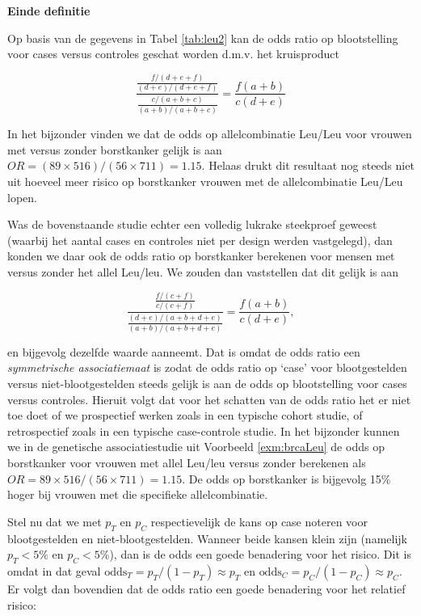 \documentclass[
  12pt,dutch,coursenotes]{book}
\theoremstyle{definition}
\theoremstyle{definition}
\theoremstyle{definition}
\theoremstyle{definition}
\theoremstyle{remark}
\begin{document}
\textbf{Einde definitie}

Op basis van de gegevens in Tabel \ref{tab:leu2} kan de odds ratio op
blootstelling voor cases versus controles geschat worden d.m.v. het kruisproduct

\begin{equation*}
\frac{ \frac{ f/(d+e+f)}{(d+e)/(d+e+f)} }{ \frac{c/(a+b+c)}{(a+b)/(a+b+c)}} = \frac{f(a+b)}{c (d+e)}
\end{equation*}

In het bijzonder vinden we dat de odds op allelcombinatie Leu/Leu voor vrouwen met versus zonder borstkanker gelijk is aan \(OR=(89\times 516)/(56\times 711)=1.15\). Helaas drukt dit resultaat nog steeds
niet uit hoeveel meer risico op borstkanker vrouwen met de allelcombinatie Leu/Leu lopen.

Was de bovenstaande studie echter een volledig lukrake steekproef geweest
(waarbij het aantal cases en controles niet per design werden vastgelegd),
dan konden we daar ook de odds ratio op borstkanker berekenen voor mensen
met versus zonder het allel Leu/leu. We zouden dan vaststellen dat dit gelijk is
aan

\begin{equation*}
\frac{ \frac{ f/(c+f)}{c/(c+f)} }{ \frac{(d+e)/(a+b+d+e)}{(a+b)/(a+b+d+e)}} = \frac{f(a+b)}{c(d+e)},
\end{equation*}

en bijgevolg dezelfde waarde aanneemt. Dat is omdat de odds ratio een
\emph{symmetrische associatiemaat} is zodat de odds ratio op `case' voor
blootgestelden versus niet-blootgestelden steeds gelijk is aan de odds op
blootstelling voor cases versus controles. Hieruit volgt dat voor het
schatten van de odds ratio het er niet toe doet of we prospectief werken
zoals in een typische cohort studie, of retrospectief zoals in een typische
case-controle studie. In het bijzonder kunnen we in de genetische associatiestudie uit
Voorbeeld \ref{exm:brcaLeu} de odds op borstkanker voor vrouwen met allel Leu/leu
versus zonder berekenen als \(OR=89\times 516/(56\times 711)=1.15\).
De odds op borstkanker is bijgevolg 15\% hoger bij vrouwen met die specifieke allelcombinatie.

Stel nu dat we met \(p_T\) en \(p_C\) respectievelijk de kans op case noteren
voor blootgestelden en niet-blootgestelden. Wanneer beide kansen klein zijn
(namelijk \(p_T<5\%\) en \(p_C<5\%\)), dan is de odds een goede benadering voor
het risico. Dit is omdat in dat geval \(\mbox{odds}_T=p_T/(1-p_T)\approx p_T\) en \(\mbox{odds}_C=p_C/(1-p_C)\approx p_C\). Er volgt dan bovendien dat de odds ratio
een goede benadering voor het relatief risico:
\end{document}
